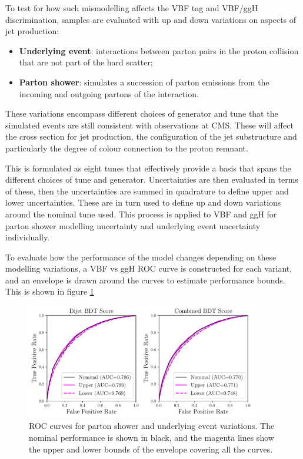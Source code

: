To test for how such mismodelling affects the VBF tag and VBF/ggH discrimination, samples are evaluated with up and down variations on aspects of jet production:
\begin{itemize}[noitemsep]
    \item \textbf{Underlying event}: interactions between parton pairs in the proton collision that are not part of the hard scatter;
    \item \textbf{Parton shower}: simulates a succession of parton emissions from the incoming and outgoing partons of the interaction.
\end{itemize}
These variations encompass different choices of generator and tune that the simulated events are still consistent with observations at CMS. 
These will affect the cross section for jet production, the configuration of the jet substructure and particularly the degree of colour connection to the proton remnant.

This is formulated as eight tunes that effectively provide a basis that spans the different choices of tune and generator. 
Uncertainties are then evaluated in terms of these, then the uncertainties are summed in quadrature to define upper and lower uncertainties. 
These are in turn used to define up and down variations around the nominal tune used. 
This process is applied to VBF and ggH for parton shower modelling uncertainty and underlying event uncertainty individually. 

To evaluate how the performance of the model changes depending on these modelling variations, a VBF vs ggH ROC curve is constructed for each variant, and an envelope is drawn around the curves to estimate performance bounds. This is shown in figure \ref{fig:event_categorisation:ps_variant_validation}
\begin{figure}[h!]
    \begin{center}
        \includegraphics[width=0.9\textwidth]{figures/event_selection/psvar_ROCs_PS.pdf}
    \end{center}
    \caption{ROC curves for parton shower and underlying event variations. The nominal performance is shown in black, 
             and the magenta lines show the upper and lower bounds of the envelope covering all the curves.}
    \label{fig:event_categorisation:ps_variant_validation}
\end{figure}

